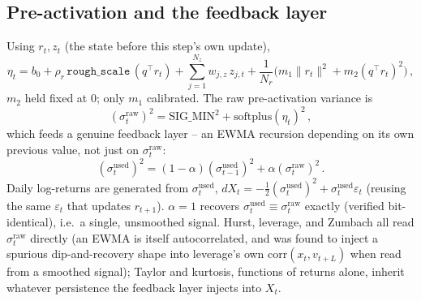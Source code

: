 \documentclass[11pt]{article}
\begin{document}
\subsection{Pre-activation and the feedback layer}
\label{sec:feedback}
Using $r_t,z_t$ (the state before this step's own update),
\begin{equation}
\eta_t = b_0 + \rho_r\,\texttt{rough\_scale}\,(q^\top r_t)
+ \sum_{j=1}^{N_z} w_{j,z}\,z_{j,t}
+ \frac{1}{N_r}\Big(m_1\lVert r_t\rVert^2 + m_2(q^\top r_t)^2\Big)\, ,
\label{eq:eta}
\end{equation}
$m_2$ held fixed at $0$; only $m_1$ calibrated. The raw pre-activation
variance is
\begin{equation}
(\sigma_t^{\text{raw}})^2 = \text{SIG\_MIN}^2+\text{softplus}(\eta_t)^2\, ,
\label{eq:sigrawdef}
\end{equation}
which feeds a genuine feedback layer -- an EWMA recursion depending on its
own previous value, not just on $\sigma_t^{\text{raw}}$:
\begin{equation}
(\sigma_t^{\text{used}})^2 = (1-\alpha)(\sigma_{t-1}^{\text{used}})^2
+\alpha(\sigma_t^{\text{raw}})^2\, .
\label{eq:sigused}
\end{equation}
Daily log-returns are generated from $\sigma_t^{\text{used}}$,
$dX_t=-\tfrac12(\sigma_t^{\text{used}})^2+\sigma_t^{\text{used}}
\varepsilon_t$ (reusing the same $\varepsilon_t$ that updates $r_{t+1}$).
$\alpha=1$ recovers $\sigma_t^{\text{used}}\equiv\sigma_t^{\text{raw}}$
exactly (verified bit-identical), i.e.\ a single, unsmoothed signal.
Hurst, leverage, and Zumbach all read $\sigma_t^{\text{raw}}$ directly (an
EWMA is itself autocorrelated, and was found to inject a spurious
dip-and-recovery shape into leverage's own $\text{corr}(x_t,v_{t+L})$ when
read from a smoothed signal); Taylor and kurtosis, functions of returns
alone, inherit whatever persistence the feedback layer injects into
$X_t$.
\end{document}
